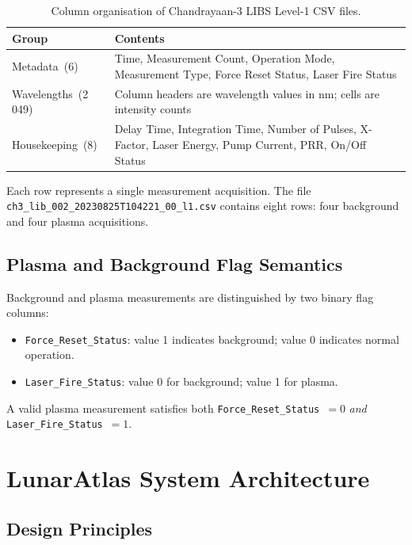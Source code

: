 \documentclass[a4paper,twocolumn,10pt]{article}
\begin{document}
\begin{table}[htbp]
\centering
\caption{Column organisation of Chandrayaan-3 LIBS Level-1 CSV files.}
\label{tab:l1_schema}
{\small
\begin{tabularx}{\columnwidth}{@{}lX@{}}
\toprule
\textbf{Group} & \textbf{Contents} \\
\midrule
Metadata~(6) & Time, Measurement Count, Operation Mode,
  Measurement Type, Force Reset Status, Laser Fire Status \\
\addlinespace
Wavelengths~(2\,049) & Column headers are wavelength values
  in nm; cells are intensity counts \\
\addlinespace
Housekeeping~(8) & Delay Time, Integration Time,
  Number of Pulses, X-Factor, Laser Energy,
  Pump Current, PRR, On/Off Status \\
\bottomrule
\end{tabularx}
}
\end{table}

Each row represents a single measurement acquisition.  The file
\texttt{ch3\_lib\_002\_20230825T104221\_00\_l1.csv} contains eight
rows: four background and four plasma acquisitions.

\subsection{Plasma and Background Flag Semantics}

Background and plasma measurements are distinguished by two binary
flag columns:
\begin{itemize}[nosep,leftmargin=*]
  \item \texttt{Force\_Reset\_Status}: value 1 indicates background;
    value 0 indicates normal operation.
  \item \texttt{Laser\_Fire\_Status}: value 0 for background; value 1
    for plasma.
\end{itemize}

A valid plasma measurement satisfies both
\texttt{Force\_Reset\_Status}~$=0$ \emph{and}
\texttt{Laser\_Fire\_Status}~$=1$.


\section{LunarAtlas System Architecture}
\label{sec:architecture}

\subsection{Design Principles}
\end{document}

